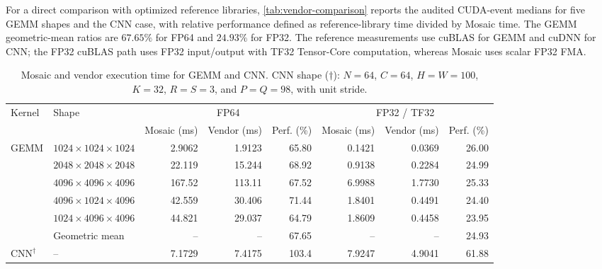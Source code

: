 For a direct comparison with optimized reference libraries, \autoref{tab:vendor-comparison} reports the audited CUDA-event medians for five GEMM shapes and the CNN case, with relative performance defined as reference-library time divided by Mosaic time. The GEMM geometric-mean ratios are \(67.65\%\) for FP64 and \(24.93\%\) for FP32. The reference measurements use cuBLAS for GEMM and cuDNN for CNN; the FP32 cuBLAS path uses FP32 input/output with TF32 Tensor-Core computation, whereas Mosaic uses scalar FP32 FMA.

\begin{table}[!t]
\centering
\caption{Mosaic and vendor execution time for GEMM and CNN. CNN shape
(\(\dagger\)): \(N=64\), \(C=64\), \(H=W=100\), \(K=32\), \(R=S=3\), and
\(P=Q=98\), with unit stride.}
\label{tab:vendor-comparison}
\scriptsize
\setlength{\tabcolsep}{2.5pt}
\renewcommand{\arraystretch}{1.04}
\begin{tabular*}{\textwidth}{@{\extracolsep{\fill}}llrrrrrr@{}}
\toprule
\multirow{2}{*}{Kernel} & \multirow{2}{*}{Shape} &
  \multicolumn{3}{c}{FP64} &
  \multicolumn{3}{c}{FP32 / TF32} \\
\cmidrule(lr){3-5}\cmidrule(lr){6-8}
& & Mosaic (ms) & Vendor (ms) & Perf. (\%)
  & Mosaic (ms) & Vendor (ms) & Perf. (\%) \\
\midrule
\multirow{6}{*}{GEMM}
& \(1024\times1024\times1024\) & 2.9062 & 1.9123 & 65.80 & 0.1421 & 0.0369 & 26.00 \\
& \(2048\times2048\times2048\) & 22.119 & 15.244 & 68.92 & 0.9138 & 0.2284 & 24.99 \\
& \(4096\times4096\times4096\) & 167.52 & 113.11 & 67.52 & 6.9988 & 1.7730 & 25.33 \\
& \(4096\times1024\times4096\) & 42.559 & 30.406 & 71.44 & 1.8401 & 0.4491 & 24.40 \\
& \(1024\times4096\times4096\) & 44.821 & 29.037 & 64.79 & 1.8609 & 0.4458 & 23.95 \\
& Geometric mean & -- & -- & 67.65 & -- & -- & 24.93 \\
\midrule
CNN\(^{\dagger}\) & -- & 7.1729 & 7.4175 & 103.4 & 7.9247 & 4.9041 & 61.88 \\
\bottomrule
\end{tabular*}
\end{table}


